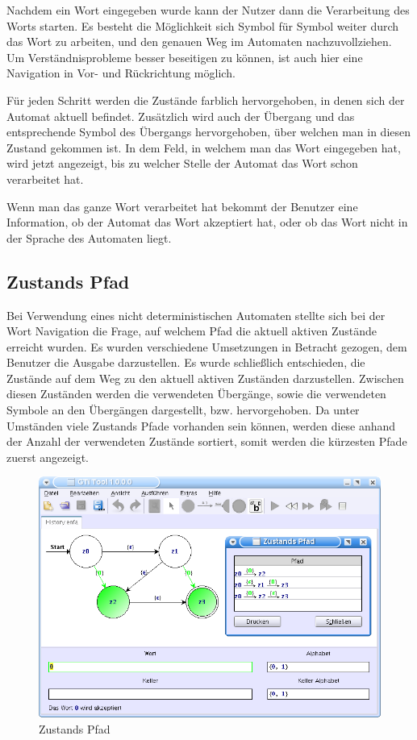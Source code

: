 Nachdem ein Wort eingegeben wurde kann der Nutzer dann die Verarbeitung des
Worts starten. Es besteht die Möglichkeit sich Symbol für Symbol weiter durch
das Wort zu arbeiten, und den genauen Weg im Automaten nachzuvollziehen. Um
Verständnisprobleme besser beseitigen zu können, ist auch hier eine Navigation
in Vor- und Rückrichtung möglich.\vspace{10pt}

Für jeden Schritt werden die Zustände farblich hervorgehoben, in denen sich der
Automat aktuell befindet. Zusätzlich wird auch der Übergang und das
entsprechende Symbol des Übergangs hervorgehoben, über welchen man in diesen
Zustand gekommen ist. In dem Feld, in welchem man das Wort eingegeben hat, wird
jetzt angezeigt, bis zu welcher Stelle der Automat das Wort schon verarbeitet
hat.\vspace{10pt}

Wenn man das ganze Wort verarbeitet hat bekommt der Benutzer eine Information,
ob der Automat das Wort akzeptiert hat, oder ob das Wort nicht in der Sprache
des Automaten liegt.\vspace{10pt}


\subsection{Zustands Pfad}

Bei Verwendung eines nicht deterministischen Automaten stellte sich bei der
Wort Navigation die Frage, auf welchem Pfad die aktuell aktiven Zustände
erreicht wurden. Es wurden verschiedene Umsetzungen in Betracht gezogen, dem
Benutzer die Ausgabe darzustellen. Es wurde schließlich entschieden, die
Zustände auf dem Weg zu den aktuell aktiven Zuständen darzustellen. Zwischen
diesen Zuständen werden die verwendeten Übergänge, sowie die verwendeten
Symbole an den Übergängen dargestellt, bzw. hervorgehoben. Da unter Umständen
viele Zustands Pfade vorhanden sein können, werden diese anhand der Anzahl der
verwendeten Zustände sortiert, somit werden die kürzesten Pfade zuerst
angezeigt.\vspace{10pt}

\begin{figure}[h!]
\begin{center}
\includegraphics[width=12cm]{../images/history_path.png}
\caption{Zustands Pfad}
\end{center}
\end{figure}
\vspace{10pt}

